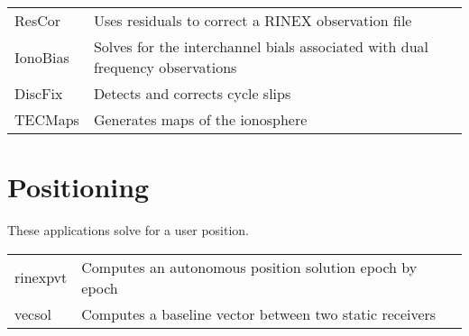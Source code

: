 \begin{center}
\begin{tabular} {|ll|} 
\hline
ResCor   & Uses residuals to correct a RINEX observation file \\
IonoBias & Solves for the interchannel bials associated with dual frequency observations \\
DiscFix  & Detects and corrects cycle slips \\
TECMaps  & Generates maps of the ionosphere \\
\hline
\end{tabular}
\end{center}

\section{Positioning}

These applications solve for a user position.

\begin{center}
\begin{tabular} {|ll|} 
\hline
rinexpvt  & Computes an autonomous position solution epoch by epoch \\
vecsol    & Computes a baseline vector between two static receivers \\
\hline
\end{tabular}
\end{center}
